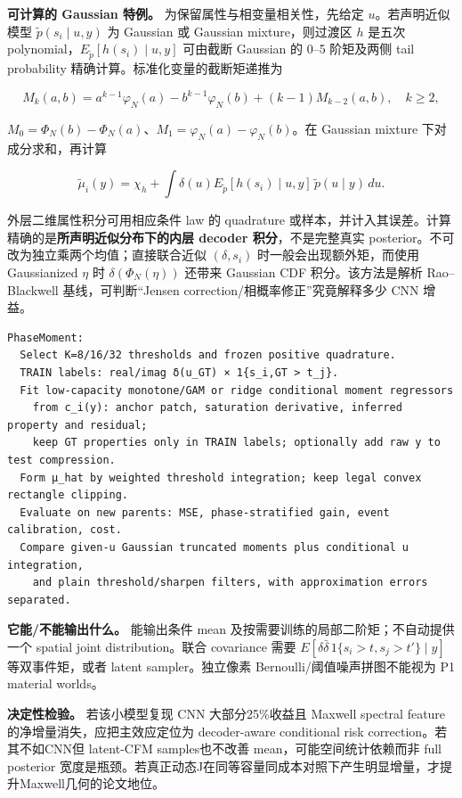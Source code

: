 \documentclass[
  11pt,
  a4paper,
]{article}
\begin{document}
\textbf{可计算的 Gaussian 特例。} 为保留属性与相变量相关性，先给定
\(u\)。若声明近似模型 \(\widetilde p(s_i\mid u,y)\) 为 Gaussian 或
Gaussian mixture，则过渡区 \(h\) 是五次
polynomial，\(E_{\widetilde p}[h(s_i)\mid u,y]\) 可由截断 Gaussian 的
0--5 阶矩及两侧 tail probability 精确计算。标准化变量的截断矩递推为

\[
M_k(a,b)=a^{k-1}\varphi_N(a)-b^{k-1}\varphi_N(b)+(k-1)M_{k-2}(a,b),\quad k\ge2,
\]

\(M_0=\Phi_N(b)-\Phi_N(a)\)、\(M_1=\varphi_N(a)-\varphi_N(b)\)。在
Gaussian mixture 下对成分求和，再计算

\[
\widetilde\mu_i(y)=\chi_h+\int\delta(u)E_{\widetilde p}[h(s_i)\mid u,y]\,\widetilde p(u\mid y)\,du.
\]

外层二维属性积分可用相应条件 law 的 quadrature
或样本，并计入其误差。计算精确的是\textbf{所声明近似分布下的内层 decoder
积分}，不是完整真实 posterior。不可改为独立乘两个均值；直接联合近似
\((\delta,s_i)\) 时一般会出现额外矩，而使用 Gaussianized \(\eta\) 时
\(\delta(\Phi_N(\eta))\) 还带来 Gaussian CDF 积分。该方法是解析
Rao--Blackwell 基线，可判断``Jensen correction/相概率修正''究竟解释多少
CNN 增益。

\begin{verbatim}
PhaseMoment:
  Select K=8/16/32 thresholds and frozen positive quadrature.
  TRAIN labels: real/imag δ(u_GT) × 1{s_i,GT > t_j}.
  Fit low-capacity monotone/GAM or ridge conditional moment regressors
    from c_i(y): anchor patch, saturation derivative, inferred property and residual;
    keep GT properties only in TRAIN labels; optionally add raw y to test compression.
  Form μ_hat by weighted threshold integration; keep legal convex rectangle clipping.
  Evaluate on new parents: MSE, phase-stratified gain, event calibration, cost.
  Compare given-u Gaussian truncated moments plus conditional u integration,
    and plain threshold/sharpen filters, with approximation errors separated.
\end{verbatim}

\textbf{它能/不能输出什么。} 能输出条件 mean
及按需要训练的局部二阶矩；不自动提供一个 spatial joint
distribution。联合 covariance 需要
\(E[\delta\bar\delta\,1\{s_i>t,s_j>t'\}\mid y]\) 等双事件矩，或者 latent
sampler。独立像素 Bernoulli/阈值噪声拼图不能视为 P1 material worlds。

\textbf{决定性检验。} 若该小模型复现 CNN 大部分25\%收益且 Maxwell
spectral feature 的净增量消失，应把主效应定位为 decoder-aware
conditional risk correction。若其不如CNN但 latent-CFM samples也不改善
mean，可能空间统计依赖而非 full posterior
宽度是瓶颈。若真正动态J在同等容量同成本对照下产生明显增量，才提升Maxwell几何的论文地位。
\end{document}
